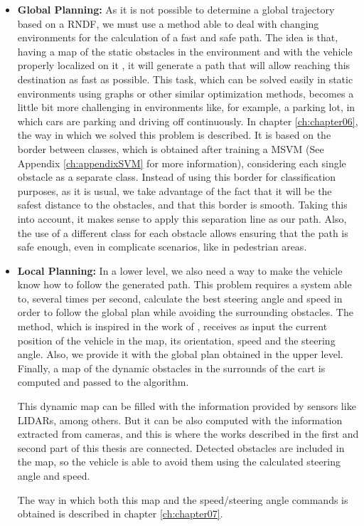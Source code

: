 \begin{itemize}
 \item \textbf{Global Planning:}
 As it is not possible to determine a global trajectory based on a \ac{RNDF}, we must use a method able to deal with changing environments for the calculation of a fast and safe path. The idea is that, having a map of the static obstacles in the environment and with the vehicle properly localized on it \citep{Perea2013mcl}, it will generate a path that will allow reaching this destination as fast as possible. This task, which can be solved easily in static environments using graphs or other similar optimization methods, becomes a little bit more challenging in environments like, for example, a parking lot, in which cars are parking and driving off continuously.
 In chapter \ref{ch:chapter06}, the way in which we solved this problem is described. It is based on the border between classes, which is obtained after training a \ac{MSVM} (See Appendix \ref{ch:appendixSVM} for more information), considering each single obstacle as a separate class. Instead of using this border for classification purposes, as it is usual, we take advantage of the fact that it will be the safest distance to the obstacles, and that this border is smooth. Taking this into account, it makes sense to apply this separation line as our path. Also, the use of a different class for each obstacle allows ensuring that the path is safe enough, even in complicate scenarios, like in pedestrian areas.
 
 \item \textbf{Local Planning:}
 In a lower level, we also need a way to make the vehicle know how to follow the generated path. This problem requires a system able to, several times per second, calculate the best steering angle and speed in order to follow the global plan while avoiding the surrounding obstacles. The method, which is inspired in the work of \cite{chu2012local}, receives as input the current position of the vehicle in the map, its orientation, speed and the steering angle. Also, we provide it with the global plan obtained in the upper level. Finally, a map of the dynamic obstacles in the surrounds of the cart is computed and passed to the algorithm.
 
  This dynamic map can be filled with the information provided by sensors like \acp{LIDAR}, among others. But it can be also computed with the information extracted from cameras, and this is where the works described in the first and second part of this thesis are connected. Detected obstacles are included in the map, so the vehicle is able to avoid them using the calculated steering angle and speed.
 
 The way in which both this map and the speed/steering angle commands is obtained is described in chapter \ref{ch:chapter07}.
\end{itemize}
 
